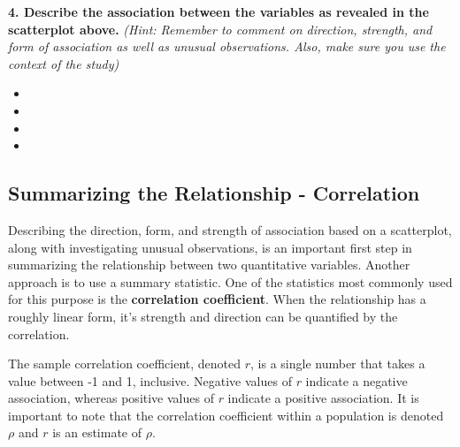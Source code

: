 \documentclass[
  letterpaper,
  DIV=11,
  numbers=noendperiod]{scrartcl}
\begin{document}
\textbf{4. Describe the association between the variables as revealed in
the scatterplot above.} \emph{(Hint: Remember to comment on direction,
strength, and form of association as well as unusual observations. Also,
make sure you use the context of the study)}

\begin{itemize}
\item
\item
\item
\item
\end{itemize}

\hypertarget{summarizing-the-relationship---correlation}{%
\subsection{Summarizing the Relationship -
Correlation}\label{summarizing-the-relationship---correlation}}

Describing the direction, form, and strength of association based on a
scatterplot, along with investigating unusual observations, is an
important first step in summarizing the relationship between two
quantitative variables. Another approach is to use a summary statistic.
One of the statistics most commonly used for this purpose is the
\textbf{correlation coefficient}. When the relationship has a roughly
linear form, it's strength and direction can be quantified by the
correlation.

The sample correlation coefficient, denoted \(r\), is a single number
that takes a value between -1 and 1, inclusive. Negative values of \(r\)
indicate a negative association, whereas positive values of \(r\)
indicate a positive association. It is important to note that the
correlation coefficient within a population is denoted \(\rho\) and
\(r\) is an estimate of \(\rho\).
\end{document}
